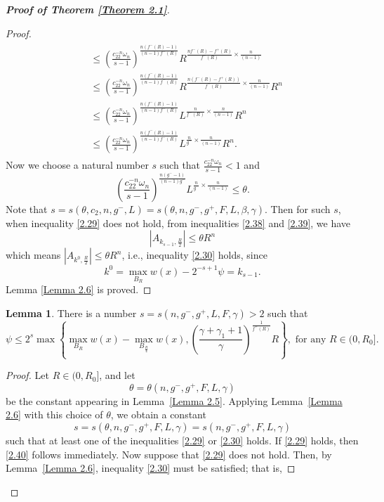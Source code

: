 \documentclass[10pt,reqno]{amsart}
\newcommand *\w{^\wedge}
\theoremstyle{definition}
\newtheorem{lemma}[theorem]{Lemma}
\numberwithin{equation}{section}
\begin{document}
\begin{proof}[\textbf{Proof of Theorem \ref{Theorem 2.1}}]
\begin{proof}
\begin{align}
\begin{split}
&\leq \left(\frac{c_22^{-n}\omega_n}{s - 1}\right)^{\frac{n(f^-(R) - 1)}{(n-1)f^-(R)}} R^{\frac{nf^-(R)-f^+(R)}{f^-(R)}\times\frac{n}{(n-1)}}\\
& \leq  \left(\frac{c_22^{-n}\omega_n}{s - 1}\right)^{\frac{n(f^-(R) - 1)}{(n-1)f^-(R)}} R^{\frac{n\left(f^-(R)-f^+(R)\right)}{f^-(R)}\times\frac{n}{(n-1)}} R^n\\
& \leq  \left(\frac{c_22^{-n}\omega_n}{s - 1}\right)^{\frac{n(f^-(R) - 1)}{(n-1)f^-(R)}} L^{\frac{n}{f^-(R)}\times\frac{n}{(n-1)}} R^n\\
& \leq  \left(\frac{c_22^{-n}\omega_n}{s - 1}\right)^{\frac{n(f^-(R) - 1)}{(n-1)f^-(R)}} L^{\frac{n}{g^-}\times\frac{n}{(n-1)}} R^n.
\end{split}
\end{align}
Now we choose a natural number \(s\) such that \(\frac{c_22^{-n}\omega_n}{s - 1}<1\) and
\begin{equation}\label{2.39}
\left(\frac{c_22^{-n}\omega_n}{s - 1}\right)^{\frac{n(g^- - 1)}{(n-1)g^-}} L^{\frac{n}{g^-}\times\frac{n}{(n-1)}}\leq \theta.
\end{equation}
Note that \(s = s(\theta, c_2, n, g^-,L) = s(\theta,n,g^-,g^+,F,L,\beta,\gamma)\). Then for such \(s\), when inequality \eqref{2.29} does not hold, from inequalities \eqref{2.38} and \eqref{2.39}, we have
\[
|A_{k_{s-1}, \frac{R}{2}}| \leq \theta R^n
\]
which means \(|A_{k^0, \frac{R}{2}}| \leq \theta R^n\), i.e., inequality \eqref{2.30} hol{\rm d}s, since
\[
k^0 = \max_{B_R} w(x) - 2^{-s+1}\psi = k_{s-1}.
\]
Lemma \ref{Lemma 2.6} is proved.
\end{proof}
\begin{lemma}\label{Lemma 2.7}
There is a number \(s = s(n, g^-, g^+,  L,F, \gamma) > 2\) such that
\begin{equation}\label{2.40}
\psi \leq 2^s \max \left\{ \max_{B_R} w(x) - \max_{B_{\frac{R}{4}}} w(x), \left( \frac{\gamma  + \gamma_1 + 1}{\gamma} \right)^{\frac{1}{f^+(R)}} R \right\},\text{    for any } R \in (0, R_0]. 
\end{equation}
\end{lemma}
\begin{proof}
Let \( R \in (0, R_0] \), and let 
\[
\theta = \theta(n, g^-, g^+, F,L, \gamma)
\]
be the constant appearing in Lemma~\ref{Lemma 2.5}. Applying Lemma~\ref{Lemma 2.6} with this choice of \( \theta \), we obtain a constant 
\[
s = s(\theta, n, g^-, g^+, F,L, \gamma) = s(n, g^-, g^+, F,L, \gamma)
\]
such that at least one of the inequalities \eqref{2.29} or \eqref{2.30} holds.
If \eqref{2.29} holds, then \eqref{2.40} follows immediately. Now suppose that \eqref{2.29} does not hold. Then, by Lemma~\ref{Lemma 2.6}, inequality \eqref{2.30} must be satisfied; that is,

\end{proof}
\end{proof}
\end{document}
